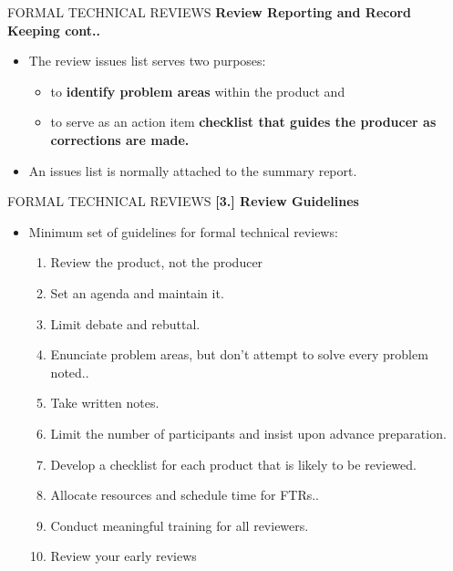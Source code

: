 \documentclass{beamer}
\begin{document}
\begin{frame}{FORMAL TECHNICAL REVIEWS}
	\textbf{ Review Reporting and Record Keeping cont..}
	\begin{itemize}
		\item The review issues list serves two purposes:
		\begin{itemize}
			\item to \textbf{identify problem areas} within the product and
			\item to serve as an action item \textbf{checklist that guides the producer as corrections are made. }
		\end{itemize}
	\item An issues list is normally attached to the summary report.
	\end{itemize}
\end{frame}
\begin{frame}{FORMAL TECHNICAL REVIEWS}
	\textbf{[3.] Review Guidelines}
	\begin{itemize}
		\item Minimum set of guidelines for formal technical reviews:
		\begin{enumerate}
			\item Review the product, not the producer
			\item Set an agenda and maintain it. 
			\item Limit debate and rebuttal. 
			\item Enunciate problem areas, but don't attempt to solve every problem noted.. 
			\item Take written notes. 
		\item Limit the number of participants and insist upon advance preparation. 
			\item Develop a checklist for each product that is likely to be reviewed. 
		\item Allocate resources and schedule time for FTRs..
		\item  Conduct meaningful training for all reviewers. 
			\item Review your early reviews
			
		\end{enumerate}
	\end{itemize}
\end{frame}
\end{document}
